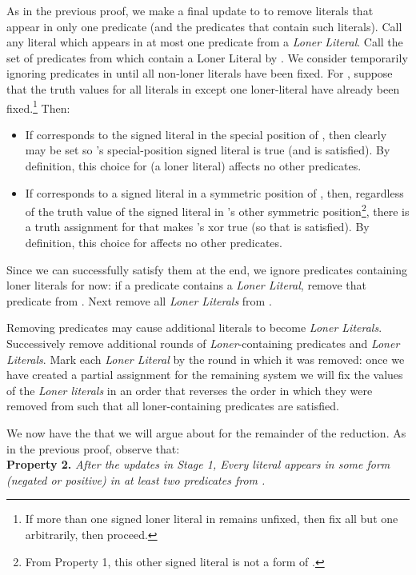 \documentclass{article}
\begin{document}
As in the previous proof, we make a final update to   to remove literals that appear in only one predicate (and the predicates that contain such literals). Call any literal  which appears in at most one predicate from  a \textit{Loner Literal}. Call the set of predicates from  which contain a Loner Literal by .  We consider temporarily ignoring predicates in  until all non-loner literals have been fixed. For , suppose that the truth values for all literals in  except one loner-literal  have already been fixed.\footnote{If more than one signed loner literal in  remains unfixed, then fix all but one arbitrarily, then proceed.} Then:
\begin{itemize}
\item If  corresponds to the signed literal in the special position of , then clearly  may be set so 's special-position signed literal is true (and  is satisfied). By definition, this choice for  (a loner literal) affects no other predicates.
\item If  corresponds to a signed literal in a symmetric position of , then, regardless of the truth value of the signed literal in 's other symmetric position\footnote{From Property 1, this other signed literal is not a form of .}, there is a truth assignment for  that makes 's xor true (so that  is satisfied). By definition, this choice for  affects no other predicates. 
\end{itemize}

Since we can successfully satisfy them at the end, we ignore predicates containing loner literals for now: if a predicate contains a \textit{Loner Literal}, remove that predicate from . Next remove all \textit{Loner Literals} from . 

Removing predicates may cause additional literals to become \textit{Loner Literals}. Successively remove additional rounds of \textit{Loner}-containing predicates and \textit{Loner Literals}. Mark each \textit{Loner Literal} by the round in which it was removed: once we have created a partial assignment for the remaining system we will fix the values of the \textit{Loner literals} in an order that reverses the order in which they were removed from  such that all loner-containing predicates are satisfied. 

We now have the  that we will argue about for the remainder of the reduction. As in the previous proof, observe that: \\

\noindent \textbf{Property 2.} \textit{After the updates in Stage 1, Every literal  appears in some form (negated or positive) in at least two predicates from .}\\
\end{document}
